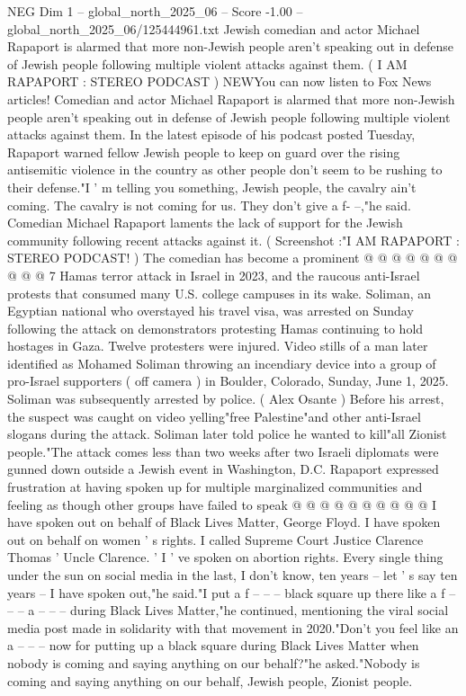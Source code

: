 \begin{textsample}{NEG Dim 1 – global\_north\_2025\_06 – Score -1.00 – global\_north\_2025\_06/125444961.txt}  \label{ex:f1_neg_140}
Jewish comedian and actor Michael Rapaport is alarmed that more non-Jewish people aren't speaking out in defense of Jewish people following multiple violent attacks against them. ( I AM RAPAPORT : STEREO PODCAST ) NEWYou can now listen to Fox News articles!
Comedian and actor Michael Rapaport is alarmed that more non-Jewish people aren't speaking out in defense of Jewish people following multiple violent attacks against them.
In the latest episode of his podcast posted Tuesday, Rapaport warned fellow Jewish people to keep on guard over the rising antisemitic violence in the country as other people don't seem to be rushing to their defense."I ' m telling you something, Jewish people, the cavalry ain't coming.
The cavalry is not coming for us.
They don't give a f- --,"he said.
Comedian Michael Rapaport laments the lack of support for the Jewish community following recent attacks against it. ( Screenshot :"I AM RAPAPORT : STEREO PODCAST! ) The comedian has become a prominent @ @ @ @ @ @ @ @ @ @ 7 Hamas terror attack in Israel in 2023, and the raucous anti-Israel protests that consumed many U.S. college campuses in its wake.
Soliman, an Egyptian national who overstayed his travel visa, was arrested on Sunday following the attack on demonstrators protesting Hamas continuing to hold hostages in Gaza.
Twelve protesters were injured.
Video stills of a man later identified as Mohamed Soliman throwing an incendiary device into a group of pro-Israel supporters ( off camera ) in Boulder, Colorado, Sunday, June 1, 2025.
Soliman was subsequently arrested by police. ( Alex Osante ) Before his arrest, the suspect was caught on video yelling"free Palestine"and other anti-Israel slogans during the attack.
Soliman later told police he wanted to kill"all Zionist people."The attack comes less than two weeks after two Israeli diplomats were gunned down outside a Jewish event in Washington, D.C.
Rapaport expressed frustration at having spoken up for multiple marginalized communities and feeling as though other groups have failed to speak @ @ @ @ @ @ @ @ @ @ I have spoken out on behalf of Black Lives Matter, George Floyd.
I have spoken out on behalf on women ' s rights.
I called Supreme Court Justice Clarence Thomas ' Uncle Clarence. ' I ' ve spoken on abortion rights.
Every single thing under the sun on social media in the last, I don't know, ten years -- let ' s say ten years -- I have spoken out,"he said."I put a f -- -- -- black square up there like a f -- -- -- a -- -- -- during Black Lives Matter,"he continued, mentioning the viral social media post made in solidarity with that movement in 2020."Don't you feel like an a -- -- -- now for putting up a black square during Black Lives Matter when nobody is coming and saying anything on our behalf?"he asked."Nobody is coming and saying anything on our behalf, Jewish people, Zionist people.

\end{textsample}
